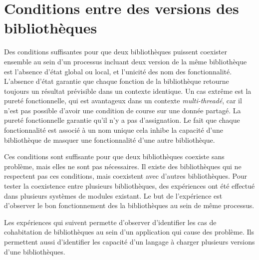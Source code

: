 


\section{Conditions entre des versions des bibliothèques}
%
Des conditions suffisantes pour que deux bibliothèques puissent coexister
ensemble au sein d'un processus incluant deux version de la même bibliothèque
est l'absence d'état global ou local, et l'unicité des nom des fonctionnalité.
L'absence d'état garantie que chaque fonction de la bibliothèque retourne
toujours un résultat prévisible dans un contexte identique. Un cas extrême est
la pureté fonctionnelle, qui est avantageux dans un contexte
\textit{multi-threadé}, car il n'est pas possible d'avoir une condition de
course sur une donnée partagé. La pureté fonctionnelle garantie qu'il n'y a pas
d'assignation.  Le fait que chaque fonctionnalité est associé à un nom unique
cela inhibe la capacité d'une bibliothèque de masquer une fonctionnalité d'une
autre bibliothèque.



Ces conditions sont suffisante pour que deux bibliothèques coexiste sans
problème, mais elles ne sont pas nécessaires. Il existe des bibliothèques qui
ne respectent pas ces conditions, mais coexistent avec d'autres bibliothèques.
Pour tester la coexistence entre plusieurs bibliothèques, des expériences ont
été effectué dans plusieurs systèmes de modules existant. Le but de
l'expérience est d'observer le bon fonctionnement des la bibliothèques au sein
de même processus.

Les expériences qui suivent permette d'observer d'identifier les cas de cohabitation de bibliothèques
au sein d'un application qui cause des problème. Ils permettent aussi d'identifier les capacité d'un
langage à charger plusieurs versions d'une bibliothèques.

